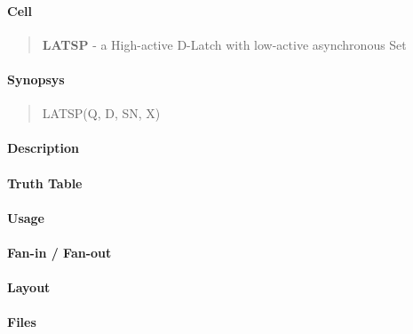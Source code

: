 \label{LATSP}
\paragraph{Cell}
\begin{quote}
    \textbf{LATSP} - a High-active D-Latch with low-active asynchronous Set
\end{quote}

\paragraph{Synopsys}
\begin{quote}
    LATSP(Q, D, SN, X)
\end{quote}

\paragraph{Description}

%

\paragraph{Truth Table}
%

\paragraph{Usage}

\paragraph{Fan-in / Fan-out}

\paragraph{Layout}

\paragraph{Files}
